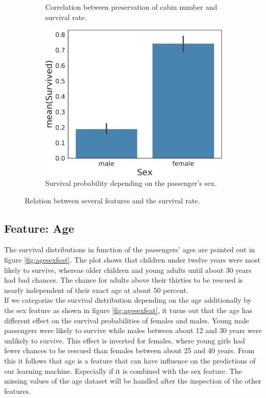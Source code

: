 \begin{figure}
\begin{subfigure}[b]{0.3\textwidth}
     \caption{Correlation between preservation of cabin number and survival rate.}
     \label{fig:cabinfeat}
    \end{subfigure}
    \quad
    \begin{subfigure}[b]{0.3\textwidth}
        \includegraphics[width=\textwidth]{media_saved/sex_survived}
  \caption{Survival probability depending on the passenger's sex.\\}
  \label{fig:sexfeat}
    \end{subfigure}
    \caption{Relation between several features and the survival rate.}
\end{figure}


\subsection{Feature: Age}
The survival distributions in function of the passengers' ages are pointed out in figure \ref{fig:agesexfeat}. The plot shows that children under twelve years were most likely to survive, whereas older children and young adults until about 30 years had bad chances. The chance for adults above their thirties to be rescued is nearly independent of their exact age at about 50 percent.\\ If we categorize the survival distribution depending on the age additionally by the sex feature as shown in figure \ref{fig:agesexfeat}, it turns out that the age has different effect on the survival probabilities of females and males. Young male passengers were likely to survive while males between about 12 and 30 years were unlikely to survive. This effect is inverted for females, where young girls had fewer chances to be rescued than females between about 25 and 40 years. From this it follows that age is a feature that can have influence on the predictions of our learning machine. Especially if it is combined with the sex feature. The missing values of the age dataset will be handled after the inspection of the other features.

